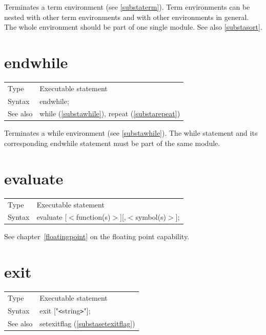 \noindent Terminates a term environment 
(see \ref{substaterm}). Term environments can be nested with 
other term environments and with other environments in general. The whole 
environment should be part of one single module. See also \ref{substasort}. 
\vspace{10mm}


\section{endwhile}
\label{substaendwhile}

\noindent \begin{tabular}{ll}
Type & Executable statement\\
Syntax & endwhile;
\\ See also & while (\ref{substawhile}), repeat (\ref{substarepeat})
\end{tabular} \vspace{4mm}

\noindent Terminates a while environment (see \ref{substawhile}). The while 
statement and its corresponding endwhile statement must be part of the same 
module. \vspace{10mm}

\section{evaluate}
\label{substaevaluate}

\noindent \begin{tabular}{ll}
Type & Executable statement\\
Syntax & evaluate [$<$function(s)$>$][,$<$symbol(s)$>$]; \\ 
\end{tabular} \vspace{4mm}

\noindent See chapter~\ref{floatingpoint} on the floating point capability.
 

\section{exit}
\label{substaexit}

\noindent \begin{tabular}{ll}
Type & Executable statement\\
Syntax & exit ["{\tt<}string{\tt>}"];
\\ See also & setexitflag (\ref{substasetexitflag})
\end{tabular} \vspace{4mm}

